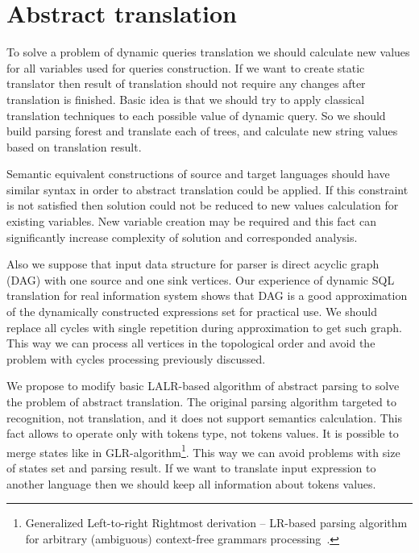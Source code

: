 \documentclass{llncs}
\begin{document}



\section{Abstract translation}
\label{sec:AbstractTranslation}

To solve a problem of dynamic queries translation we should calculate new values for all variables used for queries construction. If we want to create static translator then result of translation should not require any changes after translation is finished. Basic idea is that we should try to apply classical translation techniques to each possible value of dynamic query. So we should build parsing forest and translate each of trees, and calculate new string values based on translation result.

Semantic equivalent constructions of source and target languages should have similar syntax in order to abstract translation could be applied. If this constraint is not satisfied then solution could not be reduced to new values calculation for existing variables. New variable creation may be required and this fact can significantly increase complexity of solution and corresponded analysis.

Also we suppose that input data structure for parser is direct acyclic graph (DAG) with one source and one sink vertices. Our experience of dynamic SQL translation for real information system shows that DAG is a good approximation of the dynamically constructed expressions set for practical use. We should replace all cycles with single repetition during approximation to get such graph. This way we can process all vertices in the topological order and avoid the problem with cycles processing previously discussed.

We propose to modify basic LALR-based algorithm of abstract parsing to solve the problem of abstract translation. The original parsing algorithm targeted to recognition, not translation, and it does not support semantics calculation. This fact allows to operate only with tokens type, not tokens values. It is possible to merge states like in GLR-algorithm\footnote{Generalized Left-to-right Rightmost derivation -- LR-based parsing algorithm for arbitrary (ambiguous) context-free grammars processing~\cite{Grune}.}. This way we can avoid problems with size of states set and parsing result. If we want to translate input expression to another language then we should keep all information about tokens values. 
\end{document}
